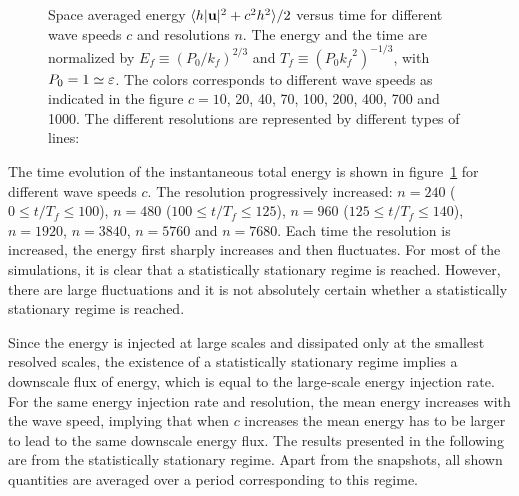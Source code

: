 \begin{figure}
\caption{Space averaged energy 
$\langle h|\textbf{u}|^2 + c^2 h^2 \rangle/2$ versus time 
for different wave speeds $c$ and resolutions $n$.
%
The energy and the time are normalized by 
$E_f\equiv (P_0/k_f)^{2/3}$ and $T_f\equiv (P_0 {k_f}^2)^{-1/3}$,
with $P_0 = 1 \simeq \varepsilon$.
%
The colors corresponds to different wave speeds as indicated in the figure
$c= 10$, 20, 40, 70, 100, 200, 400, 700 and 1000.
%
The different resolutions are represented by different types of lines:
}
\label{fig_Evstime}
\end{figure}






The time evolution of the instantaneous total energy is shown in
figure~\ref{fig_Evstime} for different wave speeds $c$.
%
The resolution  progressively
increased: %
$n = 240$ ($0\leqslant t/T_f \leqslant 100$), %
$n = 480$ ($100\leqslant t/T_f \leqslant 125$), %
$n = 960$ ($125\leqslant t/T_f \leqslant 140$), %
$n = 1920$, %
$n = 3840$, %
$n = 5760$ and %
$n = 7680$.
%
Each time the resolution is increased, the energy first sharply
increases and then fluctuates.  For most of the simulations, it is
clear that a statistically stationary regime is reached.
%
However, 
%
%
%
there are large fluctuations and it is not absolutely certain whether
a statistically stationary regime is reached.
%
%


Since the energy is injected at large scales and dissipated only at
the smallest resolved scales, the existence of a statistically
stationary regime implies a downscale flux of energy, which is equal
to the large-scale energy injection rate.
%
For the same energy injection rate and resolution, the mean energy
increases with the wave speed, implying that when $c$ increases the
mean energy has to be larger to lead to the same downscale energy
flux.
%
The results presented in the following are from the statistically
stationary regime.  Apart from the snapshots, all shown quantities are
averaged over a period corresponding to this regime.



